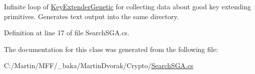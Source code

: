 Infinite loop of \hyperlink{class_crypto_1_1_key_extender_genetic}{Key\+Extender\+Genetic} for collecting data about good key extending primitives. Generates text output into the same directory. 



Definition at line 17 of file Search\+S\+G\+A.\+cs.



The documentation for this class was generated from the following file\+:\begin{DoxyCompactItemize}
\item 
C\+:/\+Martin/\+M\+F\+F/\+\_\+baka/\+Martin\+Dvorak/\+Crypto/\hyperlink{_search_s_g_a_8cs}{Search\+S\+G\+A.\+cs}\end{DoxyCompactItemize}
